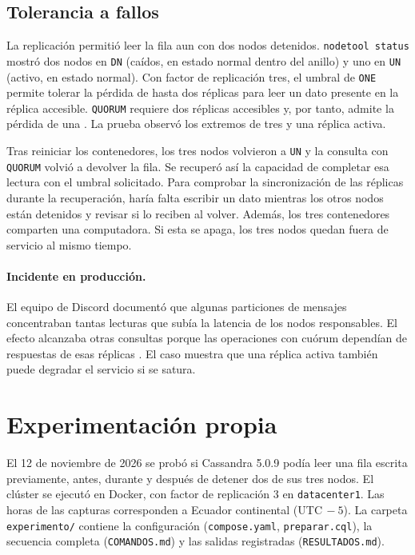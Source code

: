 \documentclass[11pt,a4paper]{article}
\begin{document}
\subsection{Tolerancia a fallos}
La replicación permitió leer la fila aun con dos nodos detenidos. \texttt{nodetool status} mostró dos nodos en \texttt{DN} (caídos, en estado normal dentro del anillo) y uno en \texttt{UN} (activo, en estado normal). Con factor de replicación tres, el umbral de \texttt{ONE} permite tolerar la pérdida de hasta dos réplicas para leer un dato presente en la réplica accesible. \texttt{QUORUM} requiere dos réplicas accesibles y, por tanto, admite la pérdida de una \cite{cassandra5dynamo}. La prueba observó los extremos de tres y una réplica activa.

Tras reiniciar los contenedores, los tres nodos volvieron a \texttt{UN} y la consulta con \texttt{QUORUM} volvió a devolver la fila. Se recuperó así la capacidad de completar esa lectura con el umbral solicitado. Para comprobar la sincronización de las réplicas durante la recuperación, haría falta escribir un dato mientras los otros nodos están detenidos y revisar si lo reciben al volver. Además, los tres contenedores comparten una computadora. Si esta se apaga, los tres nodos quedan fuera de servicio al mismo tiempo.

\paragraph{Incidente en producción.} El equipo de Discord documentó que algunas particiones de mensajes concentraban tantas lecturas que subía la latencia de los nodos responsables. El efecto alcanzaba otras consultas porque las operaciones con cuórum dependían de respuestas de esas réplicas \cite[sección \enquote{Our Cassandra Troubles}]{ingram2023discord}. El caso muestra que una réplica activa también puede degradar el servicio si se satura.

\section{Experimentación propia}
\label{sec:experimento-cassandra}
El 12 de noviembre de 2026 se probó si Cassandra 5.0.9 podía leer una fila escrita previamente, antes, durante y después de detener dos de sus tres nodos. El clúster se ejecutó en Docker, con factor de replicación 3 en \texttt{datacenter1}. Las horas de las capturas corresponden a Ecuador continental (UTC\(\,-5\)). La carpeta \texttt{experimento/} contiene la configuración (\texttt{compose.yaml}, \texttt{preparar.cql}), la secuencia completa (\texttt{COMANDOS.md}) y las salidas registradas (\texttt{RESULTADOS.md}).
\end{document}
